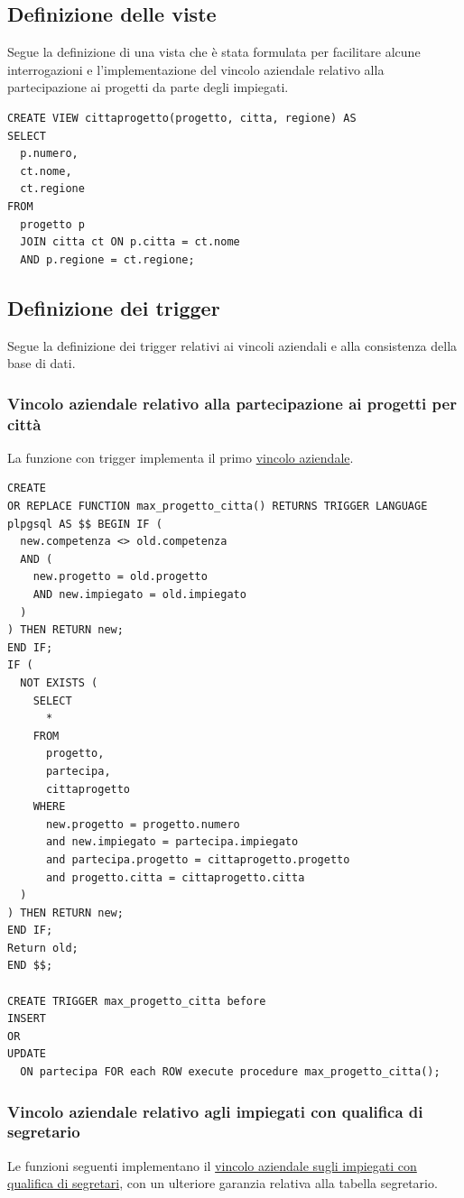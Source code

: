 \documentclass{article}
\begin{document}
\subsection{Definizione delle viste}
Segue la definizione di una vista che è stata formulata per facilitare alcune interrogazioni e l'implementazione del vincolo aziendale relativo alla partecipazione ai progetti da parte degli impiegati.
\begin{verbatim}
CREATE VIEW cittaprogetto(progetto, citta, regione) AS 
SELECT 
  p.numero, 
  ct.nome, 
  ct.regione 
FROM 
  progetto p 
  JOIN citta ct ON p.citta = ct.nome 
  AND p.regione = ct.regione;
\end{verbatim}

\newpage

\subsection{Definizione dei trigger}
Segue la definizione dei trigger relativi ai vincoli aziendali e alla consistenza della base di dati.

\subsubsection{Vincolo aziendale relativo alla partecipazione ai progetti per città}
La funzione con trigger implementa il primo \hyperlink{page.9}{vincolo aziendale}.
\begin{verbatim}
CREATE 
OR REPLACE FUNCTION max_progetto_citta() RETURNS TRIGGER LANGUAGE plpgsql AS $$ BEGIN IF (
  new.competenza <> old.competenza 
  AND (
    new.progetto = old.progetto 
    AND new.impiegato = old.impiegato
  )
) THEN RETURN new;
END IF;
IF (
  NOT EXISTS (
    SELECT 
      * 
    FROM 
      progetto, 
      partecipa, 
      cittaprogetto 
    WHERE 
      new.progetto = progetto.numero 
      and new.impiegato = partecipa.impiegato 
      and partecipa.progetto = cittaprogetto.progetto 
      and progetto.citta = cittaprogetto.citta
  )
) THEN RETURN new;
END IF;
Return old;
END $$;

CREATE TRIGGER max_progetto_citta before 
INSERT 
OR 
UPDATE 
  ON partecipa FOR each ROW execute procedure max_progetto_citta();
\end{verbatim}

\newpage

\subsubsection{Vincolo aziendale relativo agli impiegati con qualifica di segretario}
Le funzioni seguenti implementano il \hyperlink{page.16}{vincolo aziendale sugli impiegati con qualifica di segretari}, con un ulteriore garanzia relativa alla tabella segretario.
\end{document}
